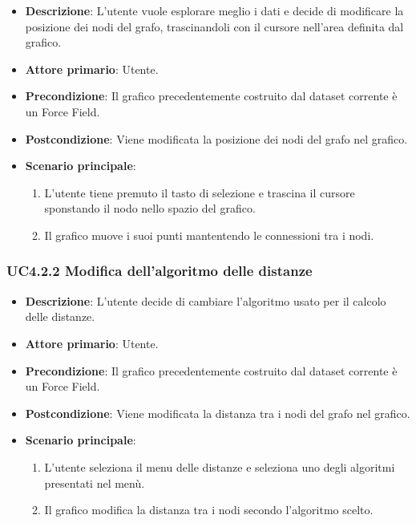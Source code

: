 \begin{itemize}
    \item \textbf{Descrizione}: L’utente vuole esplorare meglio i dati e decide di 
                                modificare la posizione dei nodi del grafo, trascinandoli con il 
                                cursore nell'area definita dal grafico.
	
    \item \textbf{Attore primario}: Utente.
    
    \item \textbf{Precondizione}:   Il grafico precedentemente costruito dal dataset corrente è un Force Field.
    \item \textbf{Postcondizione}:  Viene modificata la posizione dei nodi del grafo nel grafico.

	\item \textbf{Scenario principale}:
        \begin{enumerate}
            \item L'utente tiene premuto il tasto di selezione e trascina il cursore sponstando il nodo nello spazio del grafico.
            \item Il grafico muove i suoi punti mantentendo le connessioni tra i nodi.
        \end{enumerate}
\end{itemize}

\subsubsection{UC4.2.2 Modifica dell'algoritmo delle distanze}

\begin{itemize}
    \item \textbf{Descrizione}: L’utente decide di cambiare l’algoritmo usato per il calcolo delle distanze.

	
    \item \textbf{Attore primario}: Utente.
    
    \item \textbf{Precondizione}:   Il grafico precedentemente costruito dal dataset corrente è un Force Field.
    \item \textbf{Postcondizione}:  Viene modificata la distanza tra i nodi del grafo nel grafico.

	\item \textbf{Scenario principale}:
        \begin{enumerate}
            \item L'utente seleziona il menu delle distanze e seleziona uno degli algoritmi presentati nel menù.
            \item Il grafico modifica la distanza tra i nodi secondo l'algoritmo scelto.
        \end{enumerate}
\end{itemize}

